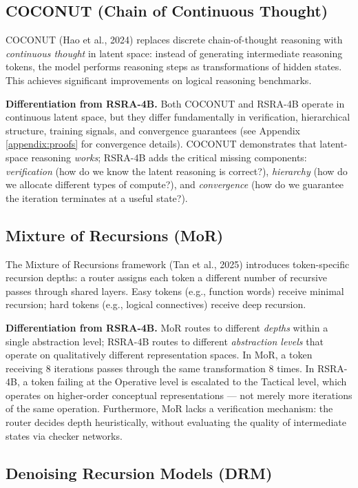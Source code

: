 \documentclass[11pt,a4paper]{article}
\theoremstyle{definition}
\begin{document}
\subsection{COCONUT (Chain of Continuous Thought)}

COCONUT (Hao et al., 2024) replaces discrete chain-of-thought reasoning with \textit{continuous thought} in latent space: instead of generating intermediate reasoning tokens, the model performs reasoning steps as transformations of hidden states. This achieves significant improvements on logical reasoning benchmarks.

\textbf{Differentiation from RSRA-4B.} Both COCONUT and RSRA-4B operate in continuous latent space, but they differ fundamentally in verification, hierarchical structure, training signals, and convergence guarantees (see Appendix \ref{appendix:proofs} for convergence details). COCONUT demonstrates that latent-space reasoning \textit{works}; RSRA-4B adds the critical missing components: \textit{verification} (how do we know the latent reasoning is correct?), \textit{hierarchy} (how do we allocate different types of compute?), and \textit{convergence} (how do we guarantee the iteration terminates at a useful state?).

\subsection{Mixture of Recursions (MoR)}

The Mixture of Recursions framework (Tan et al., 2025) introduces token-specific recursion depths: a router assigns each token a different number of recursive passes through shared layers. Easy tokens (e.g., function words) receive minimal recursion; hard tokens (e.g., logical connectives) receive deep recursion.

\textbf{Differentiation from RSRA-4B.} MoR routes to different \textit{depths} within a single abstraction level; RSRA-4B routes to different \textit{abstraction levels} that operate on qualitatively different representation spaces. In MoR, a token receiving 8 iterations passes through the same transformation 8 times. In RSRA-4B, a token failing at the Operative level is escalated to the Tactical level, which operates on higher-order conceptual representations --- not merely more iterations of the same operation. Furthermore, MoR lacks a verification mechanism: the router decides depth heuristically, without evaluating the quality of intermediate states via checker networks.

\subsection{Denoising Recursion Models (DRM)}
\end{document}
